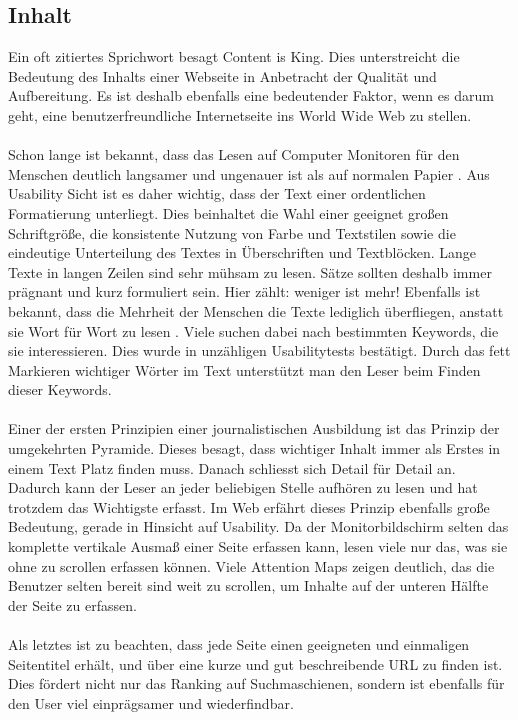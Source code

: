 \subsection{Inhalt}

Ein oft zitiertes Sprichwort besagt \glqq Content is King\grqq{}. Dies unterstreicht die Bedeutung des Inhalts einer Webseite in Anbetracht der Qualität und Aufbereitung. Es ist deshalb ebenfalls eine bedeutender Faktor, wenn es darum geht, eine benutzerfreundliche Internetseite ins World Wide Web zu stellen.\\
\\
Schon lange ist bekannt, dass das Lesen auf Computer Monitoren für den Menschen deutlich langsamer und ungenauer ist als auf normalen Papier \cite{screenvspaper}. Aus Usability Sicht ist es daher wichtig, dass der Text einer ordentlichen Formatierung unterliegt. Dies beinhaltet die Wahl einer geeignet großen Schriftgröße, die konsistente Nutzung von Farbe und Textstilen sowie die eindeutige Unterteilung des Textes in Überschriften und Textblöcken. Lange Texte in langen Zeilen sind sehr mühsam zu lesen. Sätze sollten deshalb immer prägnant und kurz formuliert sein. Hier zählt: weniger ist mehr! Ebenfalls ist bekannt, dass die Mehrheit der Menschen die Texte lediglich überfliegen, anstatt sie Wort für Wort zu lesen \cite{howtoreadinweb}. Viele suchen dabei nach bestimmten Keywords, die sie interessieren. Dies wurde in unzähligen Usabilitytests bestätigt. Durch das fett Markieren wichtiger Wörter im Text unterstützt man den Leser beim Finden dieser Keywords.\\
\\
Einer der ersten Prinzipien einer journalistischen Ausbildung ist das Prinzip der \glqq umgekehrten Pyramide\grqq{}. Dieses besagt, dass wichtiger Inhalt immer als Erstes in einem Text Platz finden muss. Danach schliesst sich Detail für Detail an. Dadurch kann der Leser an jeder beliebigen Stelle aufhören zu lesen und hat trotzdem das Wichtigste erfasst. Im Web erfährt dieses Prinzip ebenfalls große Bedeutung, gerade in Hinsicht auf Usability. Da der Monitorbildschirm selten das komplette vertikale Ausmaß einer Seite erfassen kann, lesen viele nur das, was sie ohne zu scrollen erfassen können. Viele Attention Maps zeigen deutlich, das die Benutzer selten bereit sind weit zu scrollen, um Inhalte auf der unteren Hälfte der Seite zu erfassen.\\
\\
Als letztes ist zu beachten, dass jede Seite einen geeigneten und einmaligen Seitentitel erhält, und über eine kurze und gut beschreibende URL zu finden ist. Dies fördert nicht nur das Ranking auf Suchmaschienen, sondern ist ebenfalls für den User viel einprägsamer und wiederfindbar.